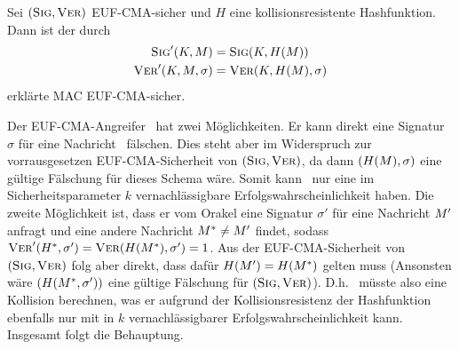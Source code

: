 
\begin{theorem} Sei $(\textsc{Sig}, \textsc{Ver})$ EUF-CMA-sicher und $H$ eine
  kollisionsresistente Hashfunktion. Dann ist der durch
  \begin{align*} 
    \textsc{Sig}'(K,M) &= \textsc{Sig}(K,H(M))\\ 
    \textsc{Ver}'(K,M,\sigma) &= \textsc{Ver}(K,H(M),\sigma)
  \end{align*} erklärte MAC EUF-CMA-sicher.~\\
\end{theorem}

\begin{beweisidee}
  \label{ch:symauth:eufcma-beweis}
Der  EUF-CMA-Angreifer \A~hat zwei Möglichkeiten. Er kann direkt eine
Signatur $\sigma$ für eine Nachricht \plaint~fälschen. Dies steht aber
im Widerspruch zur vorrausgesetzen EUF-CMA-Sicherheit von $(\textsc{Sig},
\textsc{Ver})$, da dann $(H(M), \sigma)$ eine gültige Fälschung für dieses
Schema wäre. Somit kann \A~nur eine im Sicherheitsparameter $k$ vernachlässigbare
Erfolgswahrscheinlichkeit haben. Die zweite Möglichkeit ist, dass er vom
Orakel eine Signatur $\sigma'$ für eine Nachricht $M'$ anfragt und
eine andere Nachricht $M^* \neq M'$ findet, sodass
$\textsc{Ver}'(H^*, \sigma') = \textsc{Ver}(H(M^*), \sigma') = 1$. Aus der
EUF-CMA-Sicherheit von $(\textsc{Sig},\textsc{Ver})$ folg aber direkt, dass dafür
$H(M') = H(M^*)$ gelten muss (Ansonsten wäre $(H(M^*,
\sigma'))$ eine gültige Fälschung für $(\textsc{Sig}, \textsc{Ver})$). D.h. \A~müsste
also eine Kollision berechnen, was er aufgrund der Kollisionsresistenz
der Hashfunktion ebenfalls nur mit in $k$ vernachlässigbarer
Erfolgswahrscheinlichkeit kann. Insgesamt folgt die Behauptung.
\end{beweisidee}

